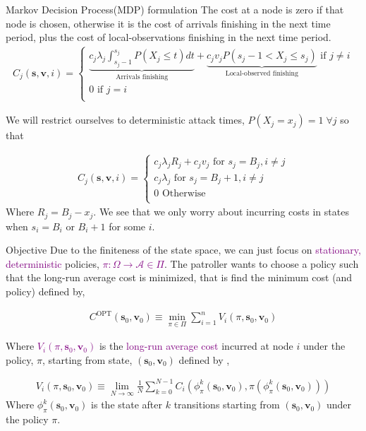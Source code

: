 \documentclass[10pt]{beamer}
\begin{document}
\begin{frame}{Markov Decision Process(MDP) formulation}
The cost at a node is zero if that node is chosen, otherwise it is the cost of arrivals finishing in the next time period, plus the cost of local-observations finishing in the next time period.
\
\begin{align*}
C_{j}(\bm{s},\bm{v},i)=\begin{cases}
\underbrace{c_{j} \lambda_{j} \int_{s_{j}-1}^{s_{j}} P(X_{j} \leq t) dt}_{\text{Arrivals finishing}}
+ \underbrace{c_{j}v_{j}P(s_{j}-1 < X_{j} \leq s_{j})}_{\text{Local-observed finishing}} \text{ if } j \neq i \\
0 \text{ if } j=i \\
\end{cases}
\end{align*}

\pause
We will restrict ourselves to deterministic attack times, $P(X_{j}=x_{j})=1 \; \forall j$ so that

\begin{align*}
C_{j}(\bm{s},\bm{v},i)=\begin{cases}
c_{j} \lambda_{j} R_{j} + c_{j} v_{j}  \text{ for } s_{j}=B_{j},i \neq j \\ 
c_{j} \lambda_{j} \text{ for } s_{j}=B_{j}+1,i \neq j  \\
0 \text{ Otherwise} \\
\end{cases}
\end{align*}
Where $R_{j}=B_{j}-x_{j}$. We see that we only worry about incurring costs in states when $s_{i}=B_{i}$ or $B_{i}+1$ for some $i$.
\end{frame}

\begin{frame}{Objective}
Due to the finiteness of the state space, we can just focus on \textcolor{purple}{stationary, deterministic} policies, \textcolor{purple}{$\pi: \Omega \rightarrow \mathcal{A} \in \Pi$}. The patroller wants to choose a policy such that the long-run average cost is minimized, that is find the minimum cost (and policy) defined by,

\begin{align*}
C^{\text{OPT}}(\bm{s}_{0},\bm{v}_{0}) \equiv \min\limits_{\pi \in \Pi} \sum\limits_{i=1}^{n} V_{i}(\pi,\bm{s}_{0},\bm{v}_{0})
\end{align*}

Where \textcolor{purple}{$V_{i}(\pi,\bm{s}_{0},\bm{v}_{0})$} is the \textcolor{purple}{long-run average cost} incurred at node $i$ under the policy, $\pi$, starting from state, $(\bm{s}_{0},\bm{v}_{0})$ defined by ,

\begin{align*}
V_{i}(\pi,\bm{s}_{0},\bm{v}_{0}) \equiv \lim\limits_{N \rightarrow \infty} \frac{1}{N} \sum\limits_{k=0}^{N-1} C_{i}(\phi^{k}_{\pi}(\bm{s}_{0},\bm{v}_{0}),\pi(\phi^{k}_{\pi}(\bm{s}_{0},\bm{v}_{0})))
\end{align*}
Where $\phi^{k}_{\pi}(\bm{s}_{0},\bm{v}_{0})$ is the state after $k$ transitions starting from $(\bm{s}_{0},\bm{v}_{0})$ under the policy $\pi$.

\end{frame}
\end{document}
